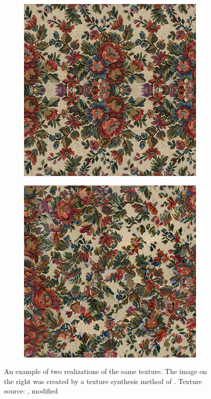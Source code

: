 \begin{figure}[ht]
    \centering
    \begin{subfigure}[b]{0.48\textwidth}
        \centering
        \includegraphics[width=\textwidth]{images/02-flowers1.png}
        \caption*{}
    \end{subfigure}
    \hfill
    \begin{subfigure}[b]{0.48\textwidth}
        \centering
        \includegraphics[width=\textwidth]{images/02-flowers2.png}
        \caption*{}
    \end{subfigure}
    \caption{An example of two realizations of the same texture. The image on the right was created by a texture synthesis method of \citet{Gatys2015}. Texture source: \citet{Pixar128}, modified}
    \label{fig:background_similar_textures}
\end{figure}


